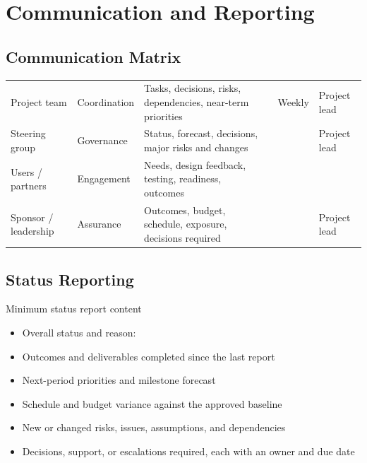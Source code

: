 \section{Communication and Reporting}

\subsection{Communication Matrix}
\begin{tabularx}{\textwidth}{L{1.0in} L{0.85in} Y L{0.8in} L{0.75in} L{0.75in}}
\toprule
{} &  &  &  &  &  \\
\midrule
Project team & Coordination & Tasks, decisions, risks, dependencies, near-term priorities &  & Weekly & Project lead \\
Steering group & Governance & Status, forecast, decisions, major risks and changes &  &  & Project lead \\
Users / partners & Engagement & Needs, design feedback, testing, readiness, outcomes &  &  &  \\
Sponsor / leadership & Assurance & Outcomes, budget, schedule, exposure, decisions required &  &  & Project lead \\
\bottomrule
\end{tabularx}

\subsection{Status Reporting}
\begin{planningbox}{Minimum status report content}
\begin{itemize}
  \item Overall status and reason: \StatusOnTrack\enspace \StatusAtRisk\enspace \StatusBlocked
  \item Outcomes and deliverables completed since the last report
  \item Next-period priorities and milestone forecast
  \item Schedule and budget variance against the approved baseline
  \item New or changed risks, issues, assumptions, and dependencies
  \item Decisions, support, or escalations required, each with an owner and due date
\end{itemize}
\end{planningbox}

